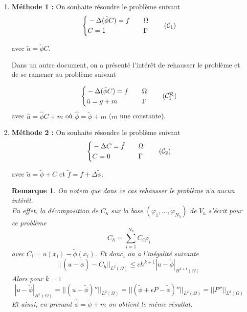 \documentclass[french]{article}
\newtheorem*{Rem}{Remarque}
\begin{document}
	\begin{enumerate}[label=\textbullet]
		\item \textbf{Méthode 1 : }
		On souhaite résoudre le problème suivant
		\begin{equation}
			\label{pbc1}
			\left\{\begin{aligned}
				&-\Delta (\tilde{\phi}C)=f \quad &&\Omega \\
				&C=1 \quad &&\Gamma
			\end{aligned}\right. \tag{$\mathcal{C}_1$}
		\end{equation}
		
		avec $\tilde{u}=\tilde{\phi}C$.
		
		Dans un autre document, on a présenté l'intérêt de rehausser le problème et de se ramener au problème suivant
		
		\begin{equation}
			\left\{\begin{aligned}
				&-\Delta (\hat{\phi}C)=f \quad &&\Omega \\
				&\hat{u}=g+m \quad &&\Gamma
			\end{aligned}\right. \label{pbc1r} \tag{$\mathcal{C}_1^\mathcal{R}$}
		\end{equation}
		avec $\hat{u}=\hat{\phi}C+m$ où $\hat{\phi}=\tilde{\phi}+m$ ($m$ une constante).
		
		
		\item \textbf{Méthode 2 : } On souhaite résoudre le problème suivant
		\begin{equation}
			\label{pbc2}
			\left\{\begin{aligned}
				&-\Delta C=\tilde{f} \quad &&\Omega \\
				&C=0 \quad &&\Gamma
			\end{aligned}\right. \tag{$\mathcal{C}_2$}
		\end{equation}
		
		avec $\tilde{u}=\tilde{\phi}+C$ et $\tilde{f}=f+\Delta\tilde{\phi}$.
		
		\begin{Rem}
			On notera que dans ce cas rehausser le problème n'a aucun intérêt. \\
			En effet, la décomposition de $C_h$ sur la base $(\varphi_1,\dots,\varphi_{N_h})$ de $V_h$ s'écrit pour ce problème			
			$$C_h=\sum_{i=1}^{N_h}C_i\varphi_i$$
			avec $C_i=u(x_i)-\tilde{\phi}(x_i)$.
			Et donc, on a l'inégalité suivante
			$$||(u-\tilde{\phi})-C_h||_{L^2(\Omega)}\le ch^{k+1}|u-\tilde{\phi}|_{H^{k+1}(\Omega)}$$
			Alors pour $k=1$
			$$|u-\tilde{\phi}|_{H^2(\Omega)}=||(u-\tilde{\phi})''||_{L^2(\Omega)}=||(\tilde{\phi}+\epsilon P-\tilde{\phi})''||_{L^2(\Omega)}=||P''||_{L^2(\Omega)}$$
			Et ainsi, en prenant $\hat{\phi}=\tilde{\phi}+m$ on obtient le même résultat.
		\end{Rem}
	\end{enumerate}
\end{document}

